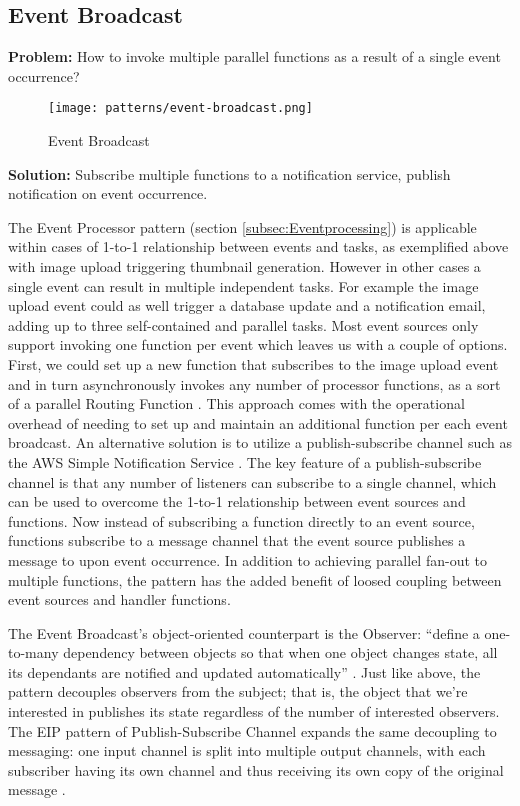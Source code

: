 \subsection{Event Broadcast} \label{subsec:EventBroadcast}

\textbf{Problem:} How to invoke multiple parallel functions as a result of a single event occurrence?

\begin{figure}[h]
  \centering
  \texttt{[image: patterns/event-broadcast.png]}
  \caption{Event Broadcast}
  \label{fig:eventBroadcast}
\end{figure}

\textbf{Solution:} Subscribe multiple functions to a notification service, publish notification on event occurrence.

The Event Processor pattern (section \ref{subsec:Eventprocessing}) is applicable within cases of 1-to-1 relationship between events and tasks, as exemplified above with image upload triggering thumbnail generation. However in other cases a single event can result in multiple independent tasks. For example the image upload event could as well trigger a database update and a notification email, adding up to three self-contained and parallel tasks. Most event sources only support invoking one function per event which leaves us with a couple of options. First, we could set up a new function that subscribes to the image upload event and in turn asynchronously invokes any number of processor functions, as a sort of a parallel Routing Function \label{subsec:routingFunction}. This approach comes with the operational overhead of needing to set up and maintain an additional function per each event broadcast. An alternative solution is to utilize a publish-subscribe channel such as the AWS Simple Notification Service \parencite{awslambda0218}. The key feature of a publish-subscribe channel is that any number of listeners can subscribe to a single channel, which can be used to overcome the 1-to-1 relationship between event sources and functions. Now instead of subscribing a function directly to an event source, functions subscribe to a message channel that the event source publishes a message to upon event occurrence. In addition to achieving parallel fan-out to multiple functions, the pattern has the added benefit of loosed coupling between event sources and handler functions. \parencite{sbarski2017serverless}

The Event Broadcast's object-oriented counterpart is the Observer: ``define a one-to-many dependency between objects so that when one object changes state, all its dependants are notified and updated automatically'' \parencite{gamma94designPatterns}. Just like above, the pattern decouples observers from the subject; that is, the object that we're interested in publishes its state regardless of the number of interested observers. The EIP pattern of Publish-Subscribe Channel expands the same decoupling to messaging: one input channel is split into multiple output channels, with each subscriber having its own channel and thus receiving its own copy of the original message \parencite{hohpe2004enterprise}.

